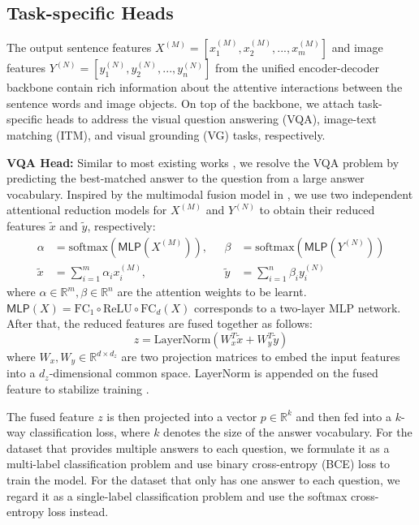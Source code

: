 \documentclass[sigconf]{acmart}
\begin{document}
\subsection{Task-specific Heads}
The output sentence features $X^{(M)}=[x_1^{(M)}, x_2^{(M)}, ...,x_m^{(M)}]$ and image features $Y^{(N)}=[y_1^{(N)}, y_2^{(N)}, ...,y_n^{(N)}]$ from the unified encoder-decoder backbone contain rich information about the attentive interactions between the sentence words and image objects. On top of the backbone, we attach task-specific heads to address the visual question answering (VQA), image-text matching (ITM), and visual grounding (VG) tasks, respectively.

\noindent\textbf{VQA Head:} Similar to most existing works \cite{antol2015vqa,yu2017mfb,kim2018bilinear}, we resolve the VQA problem by predicting the best-matched answer to the question from a large answer vocabulary. Inspired by the multimodal fusion model in \cite{yu2019mcan}, we use two independent attentional reduction models for $X^{(M)}$ and $Y^{(N)}$ to obtain their reduced features $\tilde{x}$ and $\tilde{y}$, respectively:
\begin{equation}\label{eq:self_att}
\begin{aligned}
\alpha &= \mathrm{softmax}(\textsf{MLP}(X^{(M)})),~~~&\beta&= \mathrm{softmax}(\textsf{MLP}(Y^{(N)})) \\
\tilde{x}&=\sum_{i=1}^m \alpha_ix_i^{(M)}, &\tilde{y}&=\sum_{i=1}^n \beta_iy_i^{(N)}
\end{aligned}
\end{equation}
where $\alpha\in\mathbb{R}^m, \beta\in\mathbb{R}^n$ are the attention weights to be learnt. $\textsf{MLP}(X)=\mathrm{FC}_{1}\circ\mathrm{ReLU}\circ\mathrm{FC}_{d}(X)$ corresponds to a two-layer MLP network. After that, the reduced features are fused together as follows:
\begin{equation}\label{eq:fusion_vqa}
z = \mathrm{LayerNorm}(W_x^T\tilde{x} + W_y^T\tilde{y})
\end{equation}
where $W_x, W_y\in\mathbb{R}^{d \times d_z}$ are two projection matrices to embed the input features into a $d_z$-dimensional common space. LayerNorm is appended on the fused feature to stabilize training \cite{ba2016layer}.

The fused feature $z$ is then projected into a vector $p\in\mathbb{R}^{k}$ and then fed into a $k$-way classification loss, where $k$ denotes the size of the answer vocabulary. For the dataset that provides multiple answers to each question, we formulate it as a multi-label classification problem and use binary cross-entropy (BCE) loss to train the model. For the dataset that only has one answer to each question, we regard it as a single-label classification problem and use the softmax cross-entropy loss instead.
\end{document}
